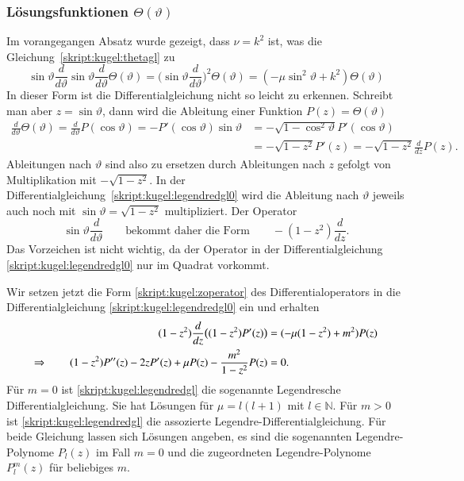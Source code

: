 \subsubsection{Lösungsfunktionen $\Theta(\vartheta)$}
Im vorangegangen Absatz wurde gezeigt, dass $\nu=k^2$ ist, was die
Gleichung~\eqref{skript:kugel:thetagl} zu
\begin{equation}
\sin\vartheta\frac{d}{d\vartheta}\sin\vartheta\frac{d}{d\vartheta}\Theta(\vartheta)
=
\biggl(\sin\vartheta\frac{d}{d\vartheta}\biggr)^2 \Theta(\vartheta)
=
(-\mu\sin^2\vartheta+k^2)\Theta(\vartheta)
\label{skript:kugel:legendredgl0}
\end{equation}
In dieser Form ist die Differentialgleichung nicht so leicht zu
erkennen.
Schreibt man aber $z=\sin\vartheta$, dann wird die Ableitung einer
Funktion $P(z)=\Theta(\vartheta)$
\begin{align*}
\frac{d}{d\vartheta}\Theta(\vartheta)
=
\frac{d}{d\vartheta}P(\cos\vartheta)
=
-P'(\cos\vartheta) \sin\vartheta
&=
-\sqrt{1-\cos^2\vartheta}P'(\cos\vartheta)
\\
&=
-\sqrt{1-z^2}P'(z)
=
-\sqrt{1-z^2}\frac{d}{dz}P(z).
\end{align*}
Ableitungen nach $\vartheta$ sind also zu ersetzen durch Ableitungen
nach $z$ gefolgt von Multiplikation mit $-\sqrt{1-z^2}$.
In der Differentialgleichung~\eqref{skript:kugel:legendredgl0}
wird die Ableitung nach $\vartheta$ jeweils auch noch mit $\sin\vartheta=\sqrt{1-z^2}$
multipliziert.
Der Operator
\begin{equation}
\sin\vartheta\frac{d}{d\vartheta}
\qquad
\text{bekommt daher die Form}
\qquad
-(1-z^2)\frac{d}{dz}.
\label{skript:kugel:zoperator}
\end{equation}
Das Vorzeichen ist nicht wichtig, da der Operator in der Differentialgleichung
\eqref{skript:kugel:legendredgl0} nur im Quadrat vorkommt.

Wir setzen jetzt die Form \eqref{skript:kugel:zoperator}
des Differentialoperators in die Differentialgleichung
\eqref{skript:kugel:legendredgl0} ein
und erhalten 
\begin{align}
(1-z^2)\frac{d}{dz}\bigl((1-z^2)P'(z)\bigr)
&=
(-\mu(1-z^2)+m^2)P(z)
\notag
\\
\Rightarrow\qquad
(1-z^2)P''(z) -2z P'(z)
+
\mu P(z)
-\frac{m^2}{1-z^2}P(z)
&=
0.
\label{skript:kugel:legendredgl}
\end{align}
Für $m=0$ ist
\eqref{skript:kugel:legendredgl}
die sogenannte Legendresche Differentialgleichung.
Sie hat Lösungen für $\mu=l(l+1)$ mit $l\in\mathbb N$.
Für $m>0$ ist
\eqref{skript:kugel:legendredgl}
die assozierte Legendre-Differentialgleichung.
Für beide Gleichung lassen sich Lösungen angeben, es sind die
sogenannten Legendre-Polynome $P_l(z)$ im Fall $m=0$ und die zugeordneten
Legendre-Polynome $P_l^m(z)$ für beliebiges $m$.

